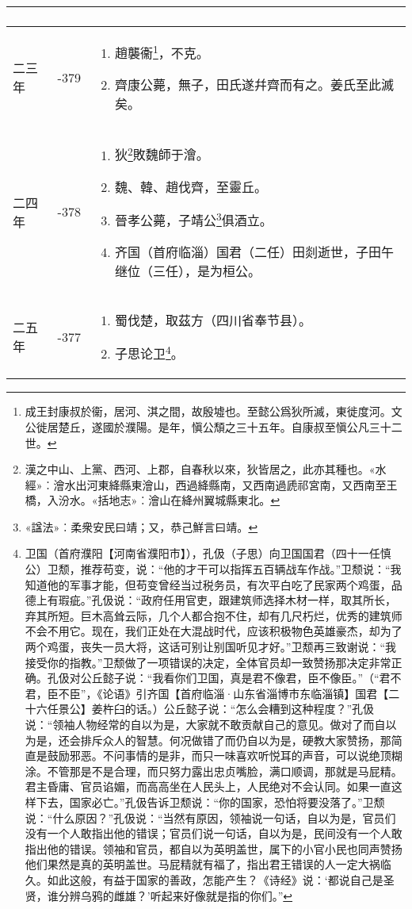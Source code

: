 \begin{longtable}{|>{\centering\scriptsize}m{2em}|>{\centering\scriptsize}m{1.3em}|>{\centering}m{8.8em}|}
\begin{enumerate}
  \end{enumerate} \tabularnewline\hline
  二三年 & -379 & \begin{enumerate}
    \tiny
  \item 趙襲衞\footnote{成王封康叔於衞，居河、淇之間，故殷墟也。至懿公爲狄所滅，東徙度河。文公徙居楚丘，遂國於濮陽。是年，愼公頹之三十五年。自康叔至愼公凡三十二世。}，不克。
  \item 齊康公薨，無子，田氏遂幷齊而有之。姜氏至此滅矣。
  \end{enumerate} \tabularnewline\hline
  二四年 & -378 & \begin{enumerate}
    \tiny
  \item 狄\footnote{漢之中山、上黨、西河、上郡，自春秋以來，狄皆居之，此亦其種也。«水經»︰澮水出河東絳縣東澮山，西過絳縣南，又西南過虒祁宮南，又西南至王橋，入汾水。«括地志»︰澮山在絳州翼城縣東北。}敗魏師于澮。
  \item 魏、韓、趙伐齊，至靈丘。
  \item 晉孝公薨，子靖公\footnote{«諡法»︰柔衆安民曰靖；又，恭己鮮言曰靖。}俱酒立。
  \item 齐国（首府临淄）国君（二任）田剡逝世，子田午继位（三任），是为桓公。
  \end{enumerate} \tabularnewline\hline
  二五年 & -377 & \begin{enumerate}
    \tiny
  \item 蜀伐楚，取茲方（四川省奉节县）。
  \item 子思论卫\footnote{卫国（首府濮阳【河南省濮阳市】），孔伋（子思）向卫国国君（四十一任慎公）卫颓，推荐苟变，说：“他的才干可以指挥五百辆战车作战。”卫颓说：“我知道他的军事才能，但苟变曾经当过税务员，有次平白吃了民家两个鸡蛋，品德上有瑕疵。”孔伋说：“政府任用官吏，跟建筑师选择木材一样，取其所长，弃其所短。巨木高耸云际，几个人都合抱不住，却有几尺朽烂，优秀的建筑师不会不用它。现在，我们正处在大混战时代，应该积极物色英雄豪杰，却为了两个鸡蛋，丧失一员大将，这话可别让别国听见才好。”卫颓再三致谢说：“我接受你的指教。”卫颓做了一项错误的决定，全体官员却一致赞扬那决定非常正确。孔伋对公丘懿子说：“我看你们卫国，真是君不像君，臣不像臣。”（“君不君，臣不臣”，《论语》引齐国【首府临淄·山东省淄博市东临淄镇】国君【二十六任景公】姜杵臼的话。）公丘懿子说：“怎么会糟到这种程度？”孔伋说：“领袖人物经常的自以为是，大家就不敢贡献自己的意见。做对了而自以为是，还会排斥众人的智慧。何况做错了而仍自以为是，硬教大家赞扬，那简直是鼓励邪恶。不问事情的是非，而只一味喜欢听悦耳的声音，可以说绝顶糊涂。不管那是不是合理，而只努力露出忠贞嘴脸，满口顺调，那就是马屁精。君主昏庸、官员谄媚，而高高坐在人民头上，人民绝对不会认同。如果一直这样下去，国家必亡。”孔伋告诉卫颓说：“你的国家，恐怕将要没落了。”卫颓说：“什么原因？”孔伋说：“当然有原因，领袖说一句话，自以为是，官员们没有一个人敢指出他的错误；官员们说一句话，自以为是，民间没有一个人敢指出他的错误。领袖和官员，都自以为英明盖世，属下的小官小民也同声赞扬他们果然是真的英明盖世。马屁精就有福了，指出君王错误的人一定大祸临久。如此这般，有益于国家的善政，怎能产生？《诗经》说：‘都说自己是圣贤，谁分辨乌鸦的雌雄？’听起来好像就是指的你们。”}。

\end{enumerate}
\end{longtable}
